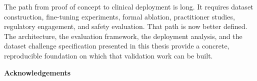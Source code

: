 \documentclass[12pt,a4paper]{report}
\begin{document}
	The path from proof of concept to clinical deployment is long. It requires
	dataset construction, fine-tuning experiments, formal ablation, practitioner
	studies, regulatory engagement, and safety evaluation. That path is now better
	defined. The architecture, the evaluation framework, the deployment analysis,
	and the dataset challenge specification presented in this thesis provide a
	concrete, reproducible foundation on which that validation work can be built.
	
	
	
	\renewcommand{\bibname}{References}  %
	
	
	
	\clearpage
	\begin{center}
		{\Large \textbf{Acknowledgements}}
	\end{center}
	\vspace{0.5cm}
	




    
	
	
	
\end{document}
